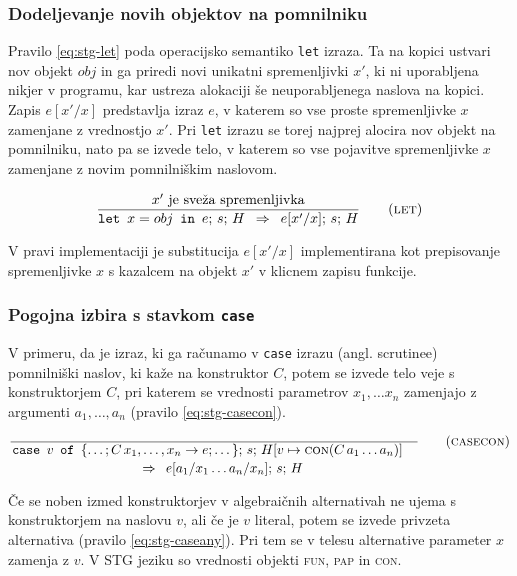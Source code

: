 \subsubsection{Dodeljevanje novih objektov na pomnilniku}

Pravilo \ref{eq:stg-let} poda operacijsko semantiko \texttt{let} izraza. Ta na kopici ustvari nov objekt $obj$ in ga priredi novi unikatni spremenljivki $x'$, ki ni uporabljena nikjer v programu, kar ustreza alokaciji še neuporabljenega naslova na kopici. Zapis $e[x' / x]$ predstavlja izraz $e$, v katerem so vse proste spremenljivke $x$ zamenjane z vrednostjo $x'$. Pri \texttt{let} izrazu se torej najprej alocira nov objekt na pomnilniku, nato pa se izvede telo, v katerem so vse pojavitve spremenljivke $x$ zamenjane z novim pomnilniškim naslovom.

\begin{equation}
\infer[let]{
	\text{$x'$ je sveža spremenljivka}
}{
	\texttt{let} \enspace x = obj \enspace \texttt{in} \enspace e; \, s; \, H
}{
	e[x'/x]; \, s; \, H
}
\label{eq:stg-let}
\end{equation}

V pravi implementaciji je substitucija $e[x'/x]$ implementirana kot prepisovanje spremenljivke $x$ s kazalcem na objekt $x'$ v klicnem zapisu funkcije.

\subsubsection{Pogojna izbira s stavkom \texttt{case}}

V primeru, da je izraz, ki ga računamo v \texttt{case} izrazu (angl. scrutinee) pomnilniški naslov, ki kaže na konstruktor $C$, potem se izvede telo veje s konstruktorjem $C$, pri katerem se vrednosti parametrov $x_1, \dots x_n$ zamenjajo z argumenti $a_1, \dots, a_n$ (pravilo \ref{eq:stg-casecon}).

\begin{equation}
	\linfer[casecon]{}{
		\texttt{case} \enspace v \enspace \texttt{of} \enspace \{ \dots; C \, x_1, \dots, x_n \to e; \dots \}; \, s; \, H[v \mapsto \textsc{con}(C \, a_1 \dots a_n)]
	}{
		e[a_1 / x_1 \dots a_n / x_n]; \, s; \, H
	}
\label{eq:stg-casecon}
\end{equation}

Če se noben izmed konstruktorjev v algebraičnih alternativah ne ujema s konstruktorjem na naslovu $v$, ali če je $v$ literal, potem se izvede privzeta alternativa (pravilo \ref{eq:stg-caseany}). Pri tem se v telesu alternative parameter $x$ zamenja z $v$. V STG jeziku so vrednosti objekti \textsc{fun}, \textsc{pap} in \textsc{con}.

